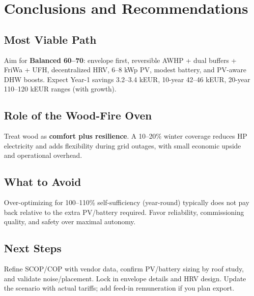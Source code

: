 \documentclass[12pt,oneside]{report}
\begin{document}
\chapter{Conclusions and Recommendations}
\section{Most Viable Path}
Aim for \textbf{Balanced 60–70}: envelope first, reversible AWHP + dual buffers + FriWa + UFH, decentralized HRV, 6–8 kWp PV, modest battery, and PV-aware DHW boosts. Expect Year-1 savings \num{3.2}–\num{3.4} kEUR, 10-year \num{42}–\num{46} kEUR, 20-year \num{110}–\num{120} kEUR ranges (with growth).

\section{Role of the Wood-Fire Oven}
Treat wood as \textbf{comfort plus resilience}. A 10–20\% winter coverage reduces HP electricity and adds flexibility during grid outages, with small economic upside and operational overhead.

\section{What to Avoid}
Over-optimizing for 100–110\% self-sufficiency (year-round) typically does not pay back relative to the extra PV/battery required. Favor reliability, commissioning quality, and safety over maximal autonomy.

\section{Next Steps}
Refine SCOP/COP with vendor data, confirm PV/battery sizing by roof study, and validate noise/placement. Lock in envelope details and HRV design. Update the scenario with actual tariffs; add feed-in remuneration if you plan export.
\end{document}
